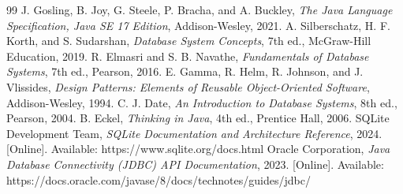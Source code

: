 \documentclass[12pt,a4paper]{report}
\begin{document}
\begin{thebibliography}{99}
 J. Gosling, B. Joy, G. Steele, P. Bracha, and A. Buckley, \textit{The Java Language Specification, Java SE 17 Edition}, Addison-Wesley, 2021.
 A. Silberschatz, H. F. Korth, and S. Sudarshan, \textit{Database System Concepts}, 7th ed., McGraw-Hill Education, 2019.
 R. Elmasri and S. B. Navathe, \textit{Fundamentals of Database Systems}, 7th ed., Pearson, 2016.
 E. Gamma, R. Helm, R. Johnson, and J. Vlissides, \textit{Design Patterns: Elements of Reusable Object-Oriented Software}, Addison-Wesley, 1994.
 C. J. Date, \textit{An Introduction to Database Systems}, 8th ed., Pearson, 2004.
 B. Eckel, \textit{Thinking in Java}, 4th ed., Prentice Hall, 2006.
 SQLite Development Team, \textit{SQLite Documentation and Architecture Reference}, 2024. [Online]. Available: https://www.sqlite.org/docs.html
 Oracle Corporation, \textit{Java Database Connectivity (JDBC) API Documentation}, 2023. [Online]. Available: https://docs.oracle.com/javase/8/docs/technotes/guides/jdbc/
\end{thebibliography}
\end{document}
